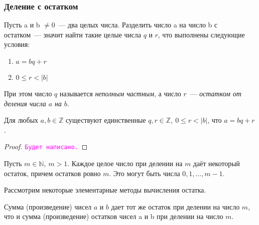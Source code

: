\documentclass[11pt]{article}
\begin{document}
\subsubsection{Деление с остатком}

\begin{definition}
    Пусть a и b $\neq 0$~--- два целых числа. Разделить число  a на число b с остатком~--- значит найти такие целые числа $q$ и $r$, что выполнены следующие условия:

	\begin{enumerate}

	    \item $a = bq + r$

		\item $0 \le r < |b|$

	\end{enumerate}

	При этом число $q$ называется \emph{неполным частным}, а число $r$~--- \emph{остатком от деления числа $a$ на $b$}.

\end{definition}

\begin{theorem}

    Для любых $a, b \in \mathbb{Z}$ существуют единственные $q, r \in \mathbb{Z}, \ 0 \le r < |b|$, что $a = bq + r$.

\end{theorem}

\begin{proof}

    \textcolor{magenta}{\texttt{Будет написано.}}

\end{proof}

\begin{corollary}

	Пусть $m \in \mathbb{N}, \ m > 1$. Каждое целое число при делении на $m$ даёт некоторый остаток, причем остатков ровно $m$.
	Это могут быть числа $0, 1, \ldots, m - 1$.

\end{corollary}

Рассмотрим некоторые элементарные методы вычисления остатка.

\begin{theorem}

	Сумма (произведение) чисел $a$ и $b$ дает тот же остаток при делении на число  $m$, что и сумма (произведение) остатков чисел a и b при делении на число $m$.

\end{theorem}
\end{document}
